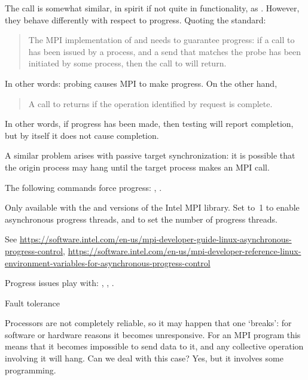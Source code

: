 \begin{remark}
  The  call is somewhat similar,
  in spirit if not quite in functionality,
  as . However, they behave differently with respect to progress.
  Quoting the standard:
  \begin{quote}
    The MPI implementation of  and
     needs to guarantee progress: if a call
    to  has been issued by a process, and a send that matches
    the probe has been initiated by some process, then the call to
     will return.
  \end{quote}
  In other words: probing causes MPI to make progress.
  On the other hand,
  \begin{quote}
    A call to  returns 
    if the operation identified by request is complete.
  \end{quote}
  In other words, if progress has been made, then testing will report completion,
  but by itself it does not cause completion.
\end{remark}

A similar problem arises with passive target synchronization:
it is possible that the origin process may hang until 
the target process makes an MPI call.

The following commands force progress:
,
.

\begin{intelnote}
  Only available with the 
  and  versions of the Intel MPI library.
  Set  to~1 to enable asynchronous progress threads,
  and  to set the number of progress threads.

  See \url{https://software.intel.com/en-us/mpi-developer-guide-linux-asynchronous-progress-control},
  \url{https://software.intel.com/en-us/mpi-developer-reference-linux-environment-variables-for-asynchronous-progress-control}
\end{intelnote}

Progress issues play with:
,
,
.

 {Fault tolerance}
\label{mpi:tolerant}

Processors are not completely reliable, so it may happen that one
`breaks': for software or hardware reasons it becomes
unresponsive. For an MPI program this means that it becomes impossible
to send data to it, and any collective operation involving it will
hang. Can we deal with this case? Yes, but it involves some
programming.


